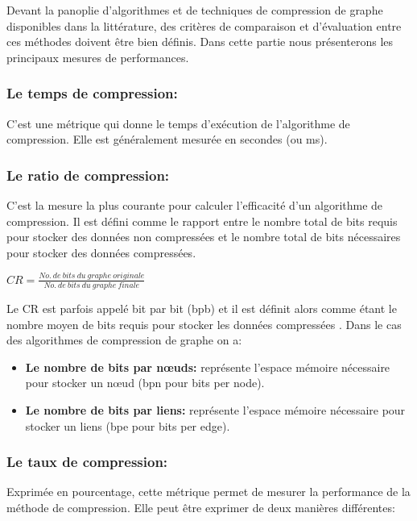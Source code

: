 	
				Devant la panoplie d'algorithmes et de techniques de compression de graphe disponibles dans la littérature, des critères de comparaison  et d'évaluation entre ces méthodes doivent être bien définis. Dans cette partie nous présenterons les principaux mesures de performances.
				
				\subsubsection{Le temps de compression:}
				C'est une métrique qui donne le temps d'exécution de l'algorithme de compression. Elle est généralement mesurée en secondes (ou ms).
				\subsubsection{Le ratio de compression:}
				C'est la mesure la plus courante pour calculer l'efficacité d'un algorithme de compression. Il est défini comme le rapport entre le nombre total de bits requis pour stocker des données non compressées et le nombre total de bits nécessaires pour stocker des données compressées.
				\begin{center}
				$
				CR = \frac{No.\ de\ bits\ du\ graphe\ originale}{No.\ de\ bits\ du\ graphe\ finale }
				$
				\end{center}
				
				
				Le CR est parfois appelé bit par bit (bpb) et il est définit alors comme étant le nombre moyen de bits requis pour stocker les données compressées \citep{uthayakumar2018survey}. Dans le cas des algorithmes de compression de graphe on a:
				\begin{itemize}
					\item \textbf{Le nombre de bits par nœuds:}
					représente l'espace mémoire nécessaire pour stocker un nœud (bpn pour bits per node).
					
					\item \textbf{Le nombre de bits par liens:}
					représente l'espace mémoire nécessaire pour stocker un liens (bpe pour bits per edge).
				\end{itemize}
				
				
				
				
				
				
				\subsubsection{Le taux de compression:}
				Exprimée en pourcentage, cette métrique permet de mesurer la performance de la méthode de compression. Elle peut être exprimer de deux manières différentes:
				
